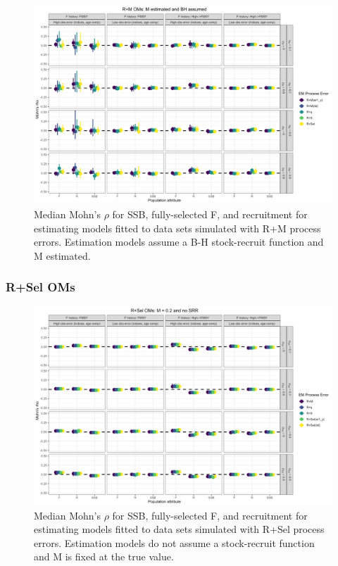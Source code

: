 \documentclass[
  12pt,
]{article}
\begin{document}
\begin{landscape}
\begin{figure}
\caption{Median Mohn's $\rho$ for SSB, fully-selected F, and recruitment for estimating models fitted to data sets simulated with R+M process errors.  Estimation models assume a B-H stock-recruit function and M estimated.}\label{M_om_em_BH_ME_mohns_rho}
\begin{center}
\includegraphics[width = \textwidth]{M_om_mohns_rho_BH_ME.png}
\end{center}
\end{figure}
\end{landscape}

\hypertarget{rsel-oms-1}{%
\subsubsection*{R+Sel OMs}\label{rsel-oms-1}}

\begin{landscape}
\begin{figure}
\caption{Median Mohn's $\rho$ for SSB, fully-selected F, and recruitment for estimating models fitted to data sets simulated with R+Sel process errors.  Estimation models do not assume a stock-recruit function and M is fixed at the true value.}\label{Sel_om_em_R_MF_mohns_rho}
\begin{center}
\includegraphics[width = \textwidth]{Sel_om_mohns_rho_R_MF.png}
\end{center}
\end{figure}
\end{landscape}
\end{document}
